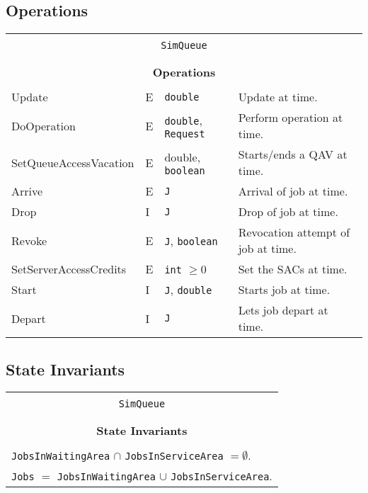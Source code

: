 \documentclass[12pt]{book}
\begin{document}
\subsection{Operations}

\begin{tabular}{|l|l|l|l|}
\hline
\multicolumn{4}{|c|}{} \\
\multicolumn{4}{|c|}{\lstinline[basicstyle=\large]{SimQueue}} \\
\multicolumn{4}{|c|}{} \\
\hline
\multicolumn{4}{|c|}{} \\
\multicolumn{4}{|c|}{\bf Operations} \\
\multicolumn{4}{|c|}{} \\
\hline
Update & E & \lstinline|double| & Update at time.\\
\hline
DoOperation & E & \lstinline|double|, \lstinline|Request| & Perform operation at time. \\
\hline
SetQueueAccessVacation & E & double, \lstinline|boolean| & Starts/ends a QAV at time. \\
\hline
Arrive & E & \lstinline|J| & Arrival of job at time. \\
\hline
Drop & I & \lstinline|J| & Drop of job at time. \\
\hline
Revoke & E & \lstinline|J|, \lstinline|boolean| & Revocation attempt of job at time. \\
\hline
SetServerAccessCredits & E & \lstinline|int| $\geq 0$ & Set the SACs at time. \\
\hline
Start & I & \lstinline|J|, \lstinline|double| & Starts job at time. \\
\hline
Depart & I & \lstinline|J| & Lets job depart at time. \\
\hline
\end{tabular}

\subsection{State Invariants}

\begin{tabular}{|l|}
\hline
\multicolumn{1}{|c|}{} \\
\multicolumn{1}{|c|}{\lstinline[basicstyle=\large]{SimQueue}} \\
\multicolumn{1}{|c|}{} \\
\hline
\multicolumn{1}{|c|}{} \\
\multicolumn{1}{|c|}{\bf State  Invariants} \\
\multicolumn{1}{|c|}{} \\
\hline
\lstinline|JobsInWaitingArea| $\cap$ \lstinline|JobsInServiceArea| $= \emptyset$. \\
\lstinline|Jobs| $=$ \lstinline|JobsInWaitingArea| $\cup$ \lstinline|JobsInServiceArea|. \\
\hline
\end{tabular}
\end{document}
